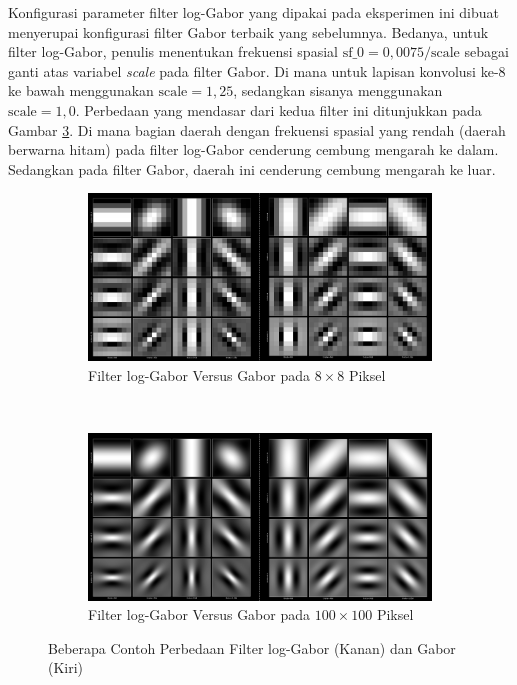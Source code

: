 Konfigurasi parameter filter log-Gabor yang dipakai pada eksperimen ini dibuat menyerupai konfigurasi filter Gabor terbaik yang sebelumnya. Bedanya, untuk filter log-Gabor, penulis menentukan frekuensi spasial $\text{sf\_0} = 0,0075 / \text{scale}$ sebagai ganti atas variabel \textit{scale} pada filter Gabor. Di mana untuk lapisan konvolusi ke-8 ke bawah menggunakan $\text{scale} = 1,25$, sedangkan sisanya menggunakan $\text{scale} = 1,0$. Perbedaan yang mendasar dari kedua filter ini ditunjukkan pada Gambar \ref{fig:filterloggaborvsgabor}. Di mana bagian daerah dengan frekuensi spasial yang rendah (daerah berwarna hitam) pada filter log-Gabor cenderung cembung mengarah ke dalam. Sedangkan pada filter Gabor, daerah ini cenderung cembung mengarah ke luar.
\begin{figure}[!t]
    \centering
    \begin{subfigure}[t]{14cm}
        \includegraphics[width=14cm]{gambar/filter_loggaborvsgabor1.png}
        \caption{Filter log-Gabor Versus Gabor pada $8 \times 8$ Piksel}
        \label{fig:filterloggaborvsgabor1}
    \end{subfigure}
    ~~~
    \begin{subfigure}[t]{14cm}
        \includegraphics[width=14cm]{gambar/filter_loggaborvsgabor2.png}
        \caption{Filter log-Gabor Versus Gabor pada $100 \times 100$ Piksel}
        \label{fig:filterloggaborvsgabor2}
    \end{subfigure}
    \caption{Beberapa Contoh Perbedaan Filter log-Gabor (Kanan) dan Gabor (Kiri)}
    \label{fig:filterloggaborvsgabor}
\end{figure}

